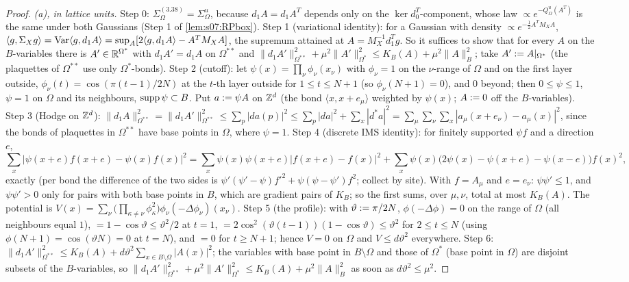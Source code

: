 \begin{proof}
\emph{(a), in lattice units.} Step 0: $\Sigma^{(3.38)}_\Omega=\Sigma^u_\Omega$, because $d_1A=d_1A^T$ depends only on the $\ker d_0^T$-component, whose law $\propto e^{-Q^u_\Omega(A^T)}$ is the same under both Gaussians (Step 1 of \cref{lem:s07:RPbox}). Step 1 (variational identity): for a Gaussian with density $\propto e^{-\frac12A^TM_XA}$, $\langle g,\Sigma_Xg\rangle=\operatorname{Var}\langle g,d_1A\rangle=\sup_A[2\langle g,d_1A\rangle-A^TM_XA]$, the supremum attained at $A=M_X^{-1}d_1^Tg$. So it suffices to show that for every $A$ on the $B$-variables there is $A'\in\mathbb R^{\Omega^*}$ with $d_1A'=d_1A$ on $\Omega^{**}$ and $\|d_1A'\|^2_{\Omega^{**}}+\mu^2\|A'\|^2_{\Omega^*}\le K_B(A)+\mu^2\|A\|^2_B$; take $A':= A|_{\Omega^*}$ (the plaquettes of $\Omega^{**}$ use only $\Omega^*$-bonds). Step 2 (cutoff): let $\psi(x)=\prod_\nu\phi_\nu(x_\nu)$ with $\phi_\nu=1$ on the $\nu$-range of $\Omega$ and on the first layer outside, $\phi_\nu(t)=\cos(\pi(t-1)/2N)$ at the $t$-th layer outside for $1\le t\le N+1$ (so $\phi_\nu(N+1)=0$), and $0$ beyond; then $0\le\psi\le1$, $\psi=1$ on $\Omega$ and its neighbours, $\operatorname{supp}\psi\subset B$. Put $a:=\psi A$ on $\mathbb Z^d$ (the bond $\langle x,x+e_\mu\rangle$ weighted by $\psi(x)$; $A:=0$ off the $B$-variables). Step 3 (Hodge on $\mathbb Z^d$): $\|d_1A\|^2_{\Omega^{**}}=\|d_1A'\|^2_{\Omega^{**}}\le\sum_p|da(p)|^2\le\sum_p|da|^2+\sum_x|d^*a|^2=\sum_\mu\sum_\nu\sum_x|a_\mu(x+e_\nu)-a_\mu(x)|^2$, since the bonds of plaquettes in $\Omega^{**}$ have base points in $\Omega$, where $\psi=1$. Step 4 (discrete IMS identity): for finitely supported $\psi f$ and a direction $e$,
\[
\sum_x|\psi(x+e)f(x+e)-\psi(x)f(x)|^2=\sum_x\psi(x)\psi(x+e)|f(x+e)-f(x)|^2+\sum_x\psi(x)\big(2\psi(x)-\psi(x+e)-\psi(x-e)\big)f(x)^2 ,
\]
exactly (per bond the difference of the two sides is $\psi'(\psi'-\psi)f'^2+\psi(\psi-\psi')f^2$; collect by site). With $f=A_\mu$ and $e=e_\nu$: $\psi\psi'\le1$, and $\psi\psi'>0$ only for pairs with both base points in $B$, which are gradient pairs of $K_B$; so the first sums, over $\mu,\nu$, total at most $K_B(A)$. The potential is $V(x)=\sum_\nu\big(\prod_{\kappa\ne\nu}\phi_\kappa^2\big)\phi_\nu(-\Delta\phi_\nu)(x_\nu)$. Step 5 (the profile): with $\vartheta:=\pi/2N$, $\phi(-\Delta\phi)=0$ on the range of $\Omega$ (all neighbours equal $1$), $=1-\cos\vartheta\le\vartheta^2/2$ at $t=1$, $=2\cos^2(\vartheta(t-1))(1-\cos\vartheta)\le\vartheta^2$ for $2\le t\le N$ (using $\phi(N+1)=\cos(\vartheta N)=0$ at $t=N$), and $=0$ for $t\ge N+1$; hence $V=0$ on $\Omega$ and $V\le d\vartheta^2$ everywhere. Step 6: $\|d_1A'\|^2_{\Omega^{**}}\le K_B(A)+d\vartheta^2\sum_{x\in B\setminus\Omega}|A(x)|^2$; the variables with base point in $B\setminus\Omega$ and those of $\Omega^*$ (base point in $\Omega$) are disjoint subsets of the $B$-variables, so $\|d_1A'\|^2_{\Omega^{**}}+\mu^2\|A'\|^2_{\Omega^*}\le K_B(A)+\mu^2\|A\|^2_B$ as soon as $d\vartheta^2\le\mu^2$.


\end{proof}
